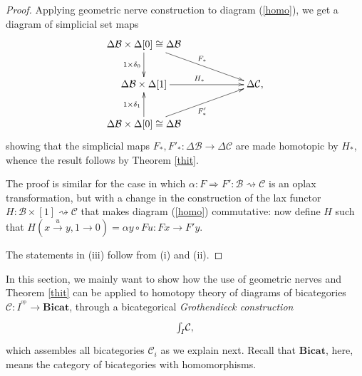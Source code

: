 \documentclass[]{amsart}
\begin{document}
\begin{proof}
Applying geometric nerve construction  to diagram (\ref{homo}), we get a diagram of simplicial set
maps
$$
\xymatrix@C=60pt{{\ensuremath{\Delta}}{\ensuremath{\mathcal{B}}}\times {\ensuremath{\Delta}}[0]\cong {\ensuremath{\Delta}}{\ensuremath{\mathcal{B}}} \ar[d]_{1\times \delta_0}\ar[dr]^{F_*}& \\
{\ensuremath{\Delta}}{\ensuremath{\mathcal{B}}}\times{\ensuremath{\Delta}}[1]\ar[r]^{H_*}&{\ensuremath{\Delta}}{\ensuremath{\mathcal{C}}},\\
{\ensuremath{\Delta}}{\ensuremath{\mathcal{B}}}\times {\ensuremath{\Delta}}[0]\cong {\ensuremath{\Delta}}{\ensuremath{\mathcal{B}}}\ar[ru]_{ F'_*}\ar[u]^{1\times\delta_1}&}
$$
showing that the simplicial maps $F_*,F'_*:{\ensuremath{\Delta}}{\ensuremath{\mathcal{B}}}\to {\ensuremath{\Delta}}{\ensuremath{\mathcal{C}}}$ are made homotopic by $H_*$, whence
the result follows by Theorem \ref{thit}.

The proof is similar for the case in which $\alpha:F\Rightarrow F':{\ensuremath{\mathcal{B}}}\rightsquigarrow{\ensuremath{\mathcal{C}}}$  is an
oplax transformation, but with a change in the construction of the lax functor
${H:{\ensuremath{\mathcal{B}}}\times[1]\rightsquigarrow {\ensuremath{\mathcal{C}}}}$ that makes diagram (\ref{homo}) commutative: now define  $H$
such that $H(x\overset{u}\to y, 1\to 0)=\alpha y\circ Fu:Fx\to F'y$.

The statements in (iii) follow from (i) and (ii).\end{proof}

In this section, we mainly want to show how the use of geometric nerves and Theorem \ref{thit} can
be applied to homotopy theory of diagrams of bicategories ${\ensuremath{\mathcal{C}}}: I^{^{\mathrm{op}}}\to {\ensuremath{\mathbf{Bicat}}} $,
through a bicategorical {\em Grothendieck construction}
$$
\xymatrix{\int_I \!{\ensuremath{\mathcal{C}}},}
$$
which assembles all bicategories ${\ensuremath{\mathcal{C}}}_i$ as we explain next. Recall that ${\ensuremath{\mathbf{Bicat}}}$, here, means the
category of bicategories with homomorphisms.
\end{document}
